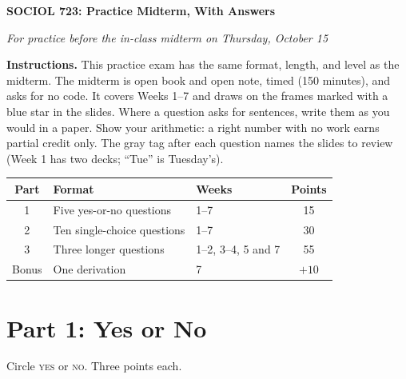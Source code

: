 \documentclass[11pt]{article}
\begin{document}
\begin{center}
{\LARGE\bfseries SOCIOL 723: Practice Midterm, With Answers\par}
\vspace{0.6em}
{\large\itshape For practice before the in-class midterm on Thursday, October 15\par}
\end{center}
\vspace{0.5em}

\textbf{Instructions.} This practice exam has the same format, length, and level as the
midterm. The midterm is open book and open note, timed (150 minutes), and asks for no
code. It covers Weeks 1--7 and draws on the frames marked with a blue star in the slides.
Where a question asks for sentences, write them as you would in a paper. Show your
arithmetic: a right number with no work earns partial credit only. The gray tag after each
question names the slides to review (Week 1 has two decks; ``Tue'' is Tuesday's).

\begin{center}
\renewcommand{\arraystretch}{1.15}
\begin{tabular}{c l l c}
\toprule
Part & Format & Weeks & Points \\
\midrule
1 & Five yes-or-no questions & 1--7 & 15 \\
2 & Ten single-choice questions & 1--7 & 30 \\
3 & Three longer questions & 1--2, 3--4, 5 and 7 & 55 \\
Bonus & One derivation & 7 & $+10$ \\
\bottomrule
\end{tabular}
\end{center}

\hrulefill

\section*{Part 1: Yes or No}
Circle \textsc{yes} or \textsc{no}. Three points each.
\end{document}
